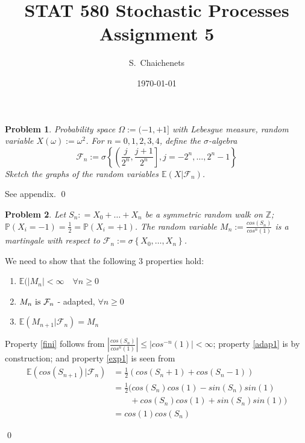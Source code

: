 \documentclass[aps,prl,twocolumn,floatfix,letterpaper]{revtex4}
\newtheorem{problem}{Problem}
\newenvironment{solution}[1][Solution]{\begin{trivlist}
    \item[\hskip \labelsep {\bfseries #1}]}{\end{trivlist}}
\newcommand{\PP}{\mathbb{P}}
\newcommand{\EE}{\mathbb{E}}
\newcommand{\FF}{\mathcal{F}}
\begin{document}
\title{STAT 580 Stochastic Processes \\
	Assignment 5}
\author{ S.\ Chaichenets }
\date{\today}
\maketitle



\begin{problem}
Probability space $\Omega := (-1,+1]$ with Lebesgue measure, random variable $X(\omega) := \omega^2$.
For $n=0,1,2,3,4$, define the $\sigma$-algebra
\begin{equation}
\FF_n := \sigma \left\{ \left( \frac{j}{2^n},\frac{j+1}{2^n}\right], j=-2^n,\ldots,2^n-1\right\}
\end{equation}
Sketch the graphs of the random variables $\EE(X|\FF_n)$.
\end{problem}

\begin{solution}
See appendix.
\qed
\end{solution}

\begin{problem}
Let $S_n : = X_0 + \ldots + X_n$ be a symmetric random walk on $\mathbb{Z}$; 
$\PP(X_i=-1) = \frac{1}{2} = \PP(X_i=+1)$.
The random variable $M_n := \frac{cos(S_n)}{cos^n(1)}$ is a martingale with respect to
$\FF_n := \sigma\left\{ X_0,\ldots,X_n\right\} $.
\end{problem}
\begin{solution}
We need to show that the following 3 properties hold:
\begin{enumerate}
	\item{$\EE(|M_n| < \infty \quad \forall n \geq 0$ \label{fini}}
	\item{$M_n\ {\rm is\ } \FF_n$ - adapted, $\forall n\geq0$ \label{adap1}}
	\item{$\EE(M_{n+1}|\FF_n) = M_n$ \label{exp1}}
\end{enumerate}
Property \ref{fini} follows from $ \left| \frac{cos(S_n)}{cos^n(1)}\right| 
		\leq \left| cos^{-n}(1) \right| 
		< \infty $;
property \ref{adap1} is by construction; and property \ref{exp1} is seen from
\scriptsize
\begin{equation}
\begin{split}
	\EE(cos(S_{n+1})|\FF_n) &= \frac{1}{2} (cos(S_n + 1) + cos(S_n - 1))		\\
		&= \frac{1}{2} (cos(S_n)cos(1) - sin(S_n)sin(1) 		\\
		& \qquad + cos(S_n)cos(1) + sin(S_n)sin(1))				\\
		&= cos(1) cos(S_n)
\end{split}
\end{equation}
\normalsize

\qed
\end{solution}
\end{document}
